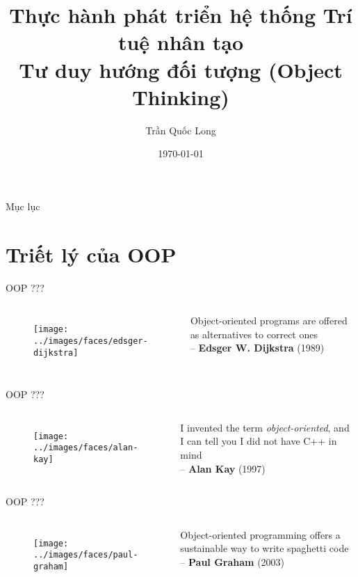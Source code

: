 \documentclass{beamer}
\title{Thực hành phát triển hệ thống Trí tuệ nhân tạo\\
Tư duy hướng đối tượng (Object Thinking)
}
\author{Trần Quốc Long}
\institute{Trường ĐH Công nghệ, ĐHQG Hà Nội}
\date{\today}
\begin{document}
\begin{frame}
    \titlepage
\end{frame}

\begin{frame}{Mục lục}
    \tableofcontents
\end{frame}

\section{Triết lý của OOP}

\begin{frame}{OOP ???}
    \begin{columns}
        \begin{figure}
            \centering
            \texttt{[image: ../images/faces/edsger-dijkstra]}
        \end{figure}
        Object-oriented programs are offered as alternatives to
        correct ones \\-- \textbf{Edsger W. Dijkstra} (1989)
    \end{columns}
\end{frame}

\begin{frame}{OOP ???}
    \begin{columns}
        \begin{figure}
            \centering
            \texttt{[image: ../images/faces/alan-kay]}
        \end{figure}
        I invented the term \emph{object-oriented}, and I can tell
        you I did not have C++ in mind\\
        -- \textbf{Alan Kay} (1997)
    \end{columns}
\end{frame}

\begin{frame}{OOP ???}
    \begin{columns}
        \begin{figure}
            \centering
            \texttt{[image: ../images/faces/paul-graham]}
        \end{figure}
        Object-oriented programming offers a sustainable way to write
        spaghetti code\\
        -- \textbf{Paul Graham} (2003)
    \end{columns}
\end{frame}
\end{document}
